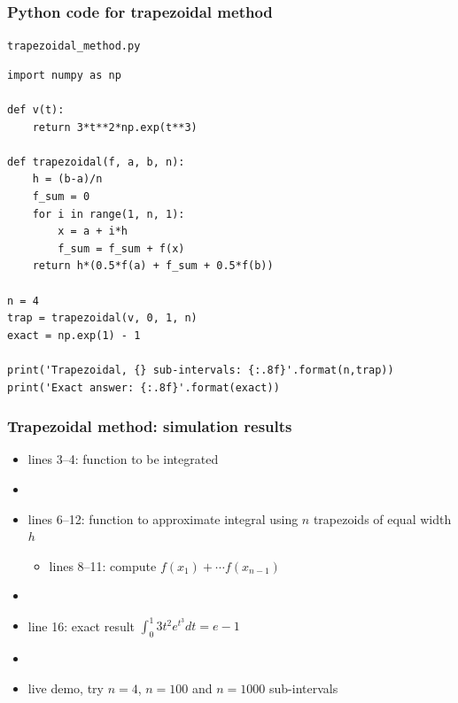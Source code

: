 \documentclass[english,14pt]{beamer}
\begin{document}

\begin{frame}[fragile]

\frametitle{Python code for trapezoidal method}

\texttt{trapezoidal\_method.py}
\begin{lstlisting}[style=CStyle,basicstyle=\scriptsize]
import numpy as np

def v(t):
    return 3*t**2*np.exp(t**3)

def trapezoidal(f, a, b, n):
    h = (b-a)/n
    f_sum = 0
    for i in range(1, n, 1):
        x = a + i*h
        f_sum = f_sum + f(x)
    return h*(0.5*f(a) + f_sum + 0.5*f(b))

n = 4
trap = trapezoidal(v, 0, 1, n)
exact = np.exp(1) - 1

print('Trapezoidal, {} sub-intervals: {:.8f}'.format(n,trap))
print('Exact answer: {:.8f}'.format(exact))
\end{lstlisting}

\end{frame}


\begin{frame}[fragile]

\frametitle{Trapezoidal method: simulation results}

\begin{itemize}
	\item lines 3--4: function to be integrated
	\item[]
	\item lines 6--12: function to approximate integral using $n$ trapezoids of equal width $h$
	\begin{itemize}
		\item lines 8--11: compute $f(x_1) + \cdots f(x_{n-1})$
	\end{itemize}
	\item[]
	\item line 16: exact result $\int_0^1 3t^2e^{t^3}dt = e - 1$
	\item[]
	\item live demo, try $n=4$, $n=100$ and $n=1000$ sub-intervals
\end{itemize}

\end{frame}
\end{document}
